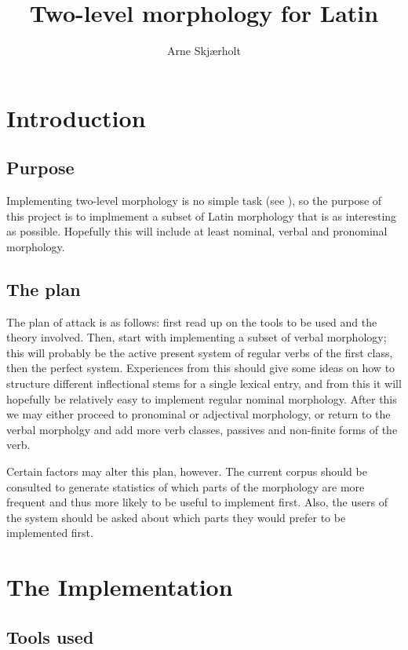 \documentclass{article}
\title{Two-level morphology for Latin}
\author{Arne Skj\ae{}rholt}
\begin{document}
\maketitle
\tableofcontents

\section{Introduction}
\subsection{Purpose}
Implementing two-level morphology is no simple task (see \cite{bondihoved}), so the purpose of this
project is to implmement a subset of Latin morphology that is as interesting
as possible. Hopefully this will include at least nominal, verbal and
pronominal morphology.

\subsection{The plan}
The plan of attack is as follows: first read up on the tools to be used and
the theory involved. Then, start with implementing a subset of verbal
morphology; this will probably be the active present system of regular verbs
of the first class, then the perfect system. Experiences from this should give
some ideas on how to structure different inflectional stems for a single
lexical entry, and from this it will hopefully be relatively easy to implement
regular nominal morphology. After this we may either proceed to pronominal or
adjectival morphology, or return to the verbal morpholgy and add more verb
classes, passives and non-finite forms of the verb.

Certain factors may alter this plan, however. The current corpus should be
consulted to generate statistics of which parts of the morphology are more
frequent and thus more likely to be useful to implement first. Also, the users
of the system should be asked about which parts they would prefer to be
implemented first.

\section{The Implementation}
\subsection{Tools used}
\end{document}
